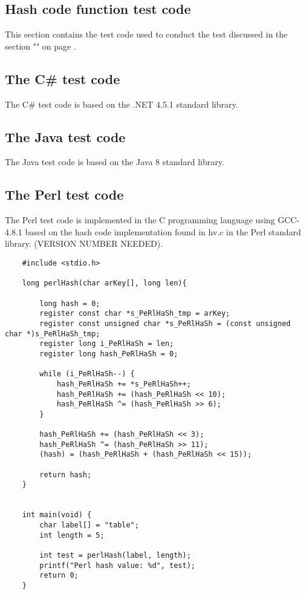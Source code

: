 \documentclass[titlepage]{article}
\begin{document}
\pagebreak
\begin{appendices}
\section{Hash code function test code}
\label{appen:HashCodeTest}
This section contains the test code used to conduct the test discussed in the section "" on page \pageref{disc:ProgrammingLangHashCodes}.



\subsection{The C\# test code}
The C\# test code is based on the .NET 4.5.1 standard library. 

\subsection{The Java test code}
The Java test code is based on the Java 8 standard library. 

\subsection{The Perl test code}
The Perl test code is implemented in the C programming language using GCC-4.8.1 based on the hash code implementation found in hv.c in the Perl standard library. (VERSION NUMBER NEEDED).

	\lstset{language=c}
	\begin{lstlisting}
	#include <stdio.h>
	
	long perlHash(char arKey[], long len){
	
		long hash = 0;
		register const char *s_PeRlHaSh_tmp = arKey;
		register const unsigned char *s_PeRlHaSh = (const unsigned char *)s_PeRlHaSh_tmp; 
		register long i_PeRlHaSh = len; 
		register long hash_PeRlHaSh = 0;
		
		while (i_PeRlHaSh--) { 
			hash_PeRlHaSh += *s_PeRlHaSh++; 
			hash_PeRlHaSh += (hash_PeRlHaSh << 10); 
			hash_PeRlHaSh ^= (hash_PeRlHaSh >> 6); 
		} 
		
		hash_PeRlHaSh += (hash_PeRlHaSh << 3); 
		hash_PeRlHaSh ^= (hash_PeRlHaSh >> 11); 
		(hash) = (hash_PeRlHaSh + (hash_PeRlHaSh << 15)); 
		
		return hash;
	}
	
	
	int main(void) {
		char label[] = "table";
		int length = 5;
		
		int test = perlHash(label, length);
		printf("Perl hash value: %d", test);
		return 0;
	}
	

\end{lstlisting}
\end{appendices}
\end{document}
